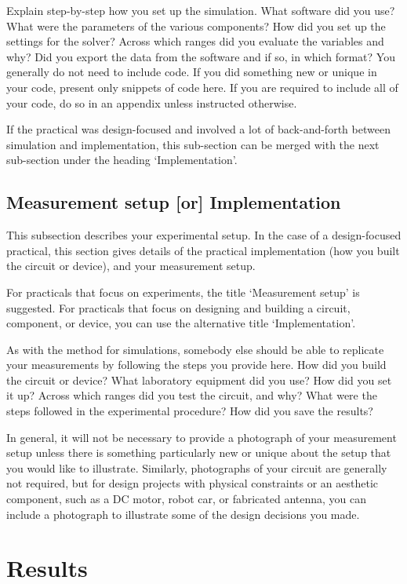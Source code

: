 \documentclass[a4paper, onecolumn, 12pt]{IEEEtran}
\begin{document}
Explain step-by-step how you set up the simulation. What software did you use? What were the parameters of the various components? How did you set up the settings for the solver? Across which ranges did you evaluate the variables and why? Did you export the data from the software and if so, in which format? You generally do not need to include code. If you did something new or unique in your code, present only snippets of code here. If you are required to include all of your code, do so in an appendix unless instructed otherwise.

If the practical was design-focused and involved a lot of back-and-forth between simulation and implementation, this sub-section can be merged with the next sub-section under the heading `Implementation'.

\subsection{Measurement setup [or] Implementation}
\label{sec:implementation}

This subsection describes your experimental setup. In the case of a design-focused practical, this section gives details of the practical implementation (how you built the circuit or device), and your measurement setup.

For practicals that focus on experiments, the title `Measurement setup' is suggested. For practicals that focus on designing and building a circuit, component, or device, you can use the alternative title `Implementation'.

As with the method for simulations, somebody else should be able to replicate your measurements by following the steps you provide here. How did you build the circuit or device? What laboratory equipment did you use? How did you set it up? Across which ranges did you test the circuit, and why? What were the steps followed in the experimental procedure? How did you save the results?

In general, it will not be necessary to provide a photograph of your measurement setup unless there is something particularly new or unique about the setup that you would like to illustrate. Similarly, photographs of your circuit are generally not required, but for design projects with physical constraints or an aesthetic component, such as a \ac{DC} motor, robot car, or fabricated antenna, you can include a photograph to illustrate some of the design decisions you made.


\section{Results}
\label{sec:results}
\end{document}
